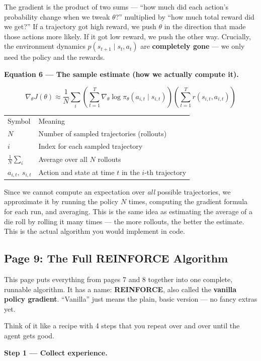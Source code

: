 \medskip
The gradient is the product of two sums --- ``how much did each action's probability change
when we tweak $\theta$?'' multiplied by ``how much total reward did we get?'' If a trajectory
got high reward, we push $\theta$ in the direction that made those actions more likely. If it
got low reward, we push the other way. Crucially, the environment dynamics
$p(s_{t+1}\mid s_t,a_t)$ are \textbf{completely gone} --- we only need the policy and
the rewards.

\medskip
\textbf{Equation 6 --- The sample estimate (how we actually compute it).}

\[
  \nabla_\theta J(\theta)
  \approx \frac{1}{N}\sum_i
    \left(\sum_{t=1}^T\nabla_\theta\log\pi_\theta(a_{i,t}\mid s_{i,t})\right)
    \left(\sum_{t=1}^T r(s_{i,t},a_{i,t})\right)
\]

\begin{tabular}{ll}
  Symbol & Meaning \\[4pt]
  $N$ & Number of sampled trajectories (rollouts) \\
  $i$ & Index for each sampled trajectory \\
  $\frac{1}{N}\sum_i$ & Average over all $N$ rollouts \\
  $a_{i,t},\ s_{i,t}$ & Action and state at time $t$ in the $i$-th trajectory \\
\end{tabular}

\medskip
Since we cannot compute an expectation over \textit{all} possible trajectories, we approximate
it by running the policy $N$ times, computing the gradient formula for each run, and averaging.
This is the same idea as estimating the average of a die roll by rolling it many times --- the
more rollouts, the better the estimate. This is the actual algorithm you would implement in
code.


\subsection{Page 9: The Full REINFORCE Algorithm}

This page puts everything from pages 7 and 8 together into one complete, runnable algorithm.
It has a name: \textbf{REINFORCE}, also called the \textbf{vanilla policy gradient}.
``Vanilla'' just means the plain, basic version --- no fancy extras yet.

Think of it like a recipe with 4 steps that you repeat over and over until the agent gets good.

\medskip
\textbf{Step 1 --- Collect experience.}

